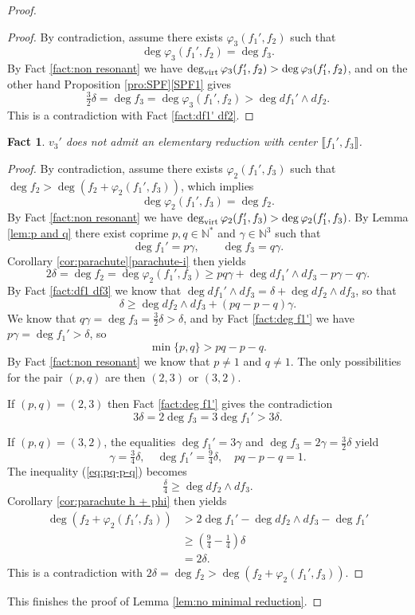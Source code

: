\documentclass[reqno,oneside,11pt]{amsart}
\theoremstyle{plain}
\newtheorem{fact}[theorem]{Fact}
\theoremstyle{definition}
\newcommand{\N}{\mathbb{N}}
\renewcommand{\phi}{\varphi}
\newcommand{\dvirt}{\deg_{\text{\rm virt}}}
\newcommand{\llb}{\llbracket}
\newcommand{\rrb}{\rrbracket}
\renewcommand{\ge}{\geqslant}
\begin{document}
\begin{proof}
\begin{proof}
By contradiction, assume there exists $\phi_3(f_1', f_2)$ such that
$$\deg{\phi_3(f_1', f_2)} = \deg{f_3}.$$
By Fact \ref{fact:non resonant} we have $\dvirt \phi_3(f_1',f_2) > \deg \phi_3(f_1',f_2)$, and on the other hand Proposition \ref{pro:SPF}\ref{SPF1} gives
$$\tfrac{3}{2}\delta = \deg f_3 = \deg \phi_3(f_1',f_2) > \deg df_1'\wedge df_2.$$
This is a contradiction with Fact \ref{fact:df1' df2}.
\end{proof}

\begin{fact} \label{fact:no f1'f3}
$v_3'$ does not admit an elementary reduction with center $\llb f_1', f_3 \rrb$.
\end{fact}

\begin{proof}
By contradiction, assume there exists $\phi_2(f_1', f_3)$ such that
$\deg f_2 > \deg (f_2 +  \phi_2(f_1', f_3))$, which implies
$$\deg{\phi_2(f_1', f_3)} = \deg{f_2}.$$
By Fact \ref{fact:non resonant} we have $\dvirt \phi_2(f_1',f_3) > \deg \phi_2(f_1',f_3)$.
By Lemma \ref{lem:p and q} there exist coprime $p,q \in \N^*$ and $\gamma \in
\N^3$ such that
$$\deg f_1' = p\gamma, \qquad \deg f_3 = q\gamma.$$
Corollary \ref{cor:parachute}\ref{parachute-i} then yields
$$ 2\delta = \deg f_2 = \deg \phi_2(f_1',f_3) \ge
pq\gamma + \deg df_1' \wedge df_3 - p\gamma - q\gamma.$$
By Fact \ref{fact:df1 df3} we know that $ \deg df_1' \wedge df_3 = \delta + \deg df_2\wedge df_3$, so that
\begin{equation}
\label{eq:pq-p-q}
\delta \ge \deg df_2\wedge df_3 + (pq - p - q) \gamma.
\end{equation}
We know that  $q\gamma = \deg f_3 = \frac{3}{2}\delta > \delta$, and by Fact \ref{fact:deg f1'} we have $p\gamma = \deg f_1' > \delta$, so
$$ \min\{p,q\} > pq - p - q .$$
By Fact \ref{fact:non resonant} we know that $p \neq 1$ and $q \neq 1$.
The only possibilities for the pair $(p,q)$ are then $(2,3)$ or $(3,2)$.

If $(p,q) = (2,3)$ then Fact \ref{fact:deg f1'} gives the contradiction
$$ 3\delta = 2 \deg f_3 = 3\deg f_1' > 3\delta.$$

If $(p,q) = (3,2)$, the equalities $\deg f_1' = 3 \gamma$ and $\deg f_3 = 2
\gamma = \frac32 \delta$  yield
$$\gamma = \tfrac{3}{4}\delta, \quad \deg f_1' = \tfrac{9}{4} \delta,
\quad pq - p-q = 1.$$
The inequality (\ref{eq:pq-p-q}) becomes
$$ \tfrac{\delta}{4} \ge \deg df_2\wedge df_3.$$
Corollary \ref{cor:parachute h + phi} then yields
\begin{align*}
\deg (f_2 + \phi_2(f_1',f_3)) &> 2\deg f_1' - \deg d f_2 \wedge d f_3 - \deg
f_1' \\
	&\ge \left( \tfrac{9}{4} - \tfrac{1}{4} \right) \delta \\
	&= 2\delta.
\end{align*}
This is a contradiction with $2\delta = \deg f_2 > \deg (f_2 +  \phi_2(f_1',f_3)).$
\end{proof}

This finishes the proof of Lemma \ref{lem:no minimal reduction}.
\end{proof}
\end{document}
